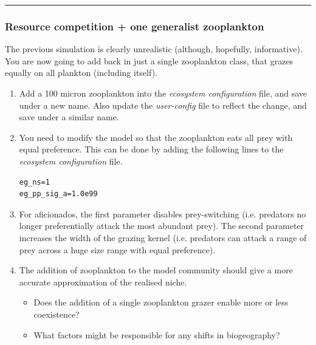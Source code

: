 \vspace{1mm}
\noindent\rule{4cm}{0.1mm}

\subsubsection*{Resource competition + one generalist zooplankton}
\vspace{1mm}

The previous simulation is clearly unrealistic (although, hopefully, informative). You are now going to add back in just a single zooplankton class, that grazes equally on all plankton (including itself).

\begin{enumerate}[noitemsep]
\vspace{1mm}
\item Add a 100 micron zooplankton into the \textit{ecosystem configuration} file, and save under a new name. Also update the \textit{user-config} file to reflect the change, and save under a similar name.
\vspace{1mm}
\item You need to modify the model so that the zooplankton eats all prey with equal preference. This can be done by adding the following lines to the \textit{ecosystem configuration} file.
\vspace{-1mm}\small\begin{verbatim}
eg_ns=1
eg_pp_sig_a=1.0e99
\end{verbatim}\normalsize\vspace{-1mm}
\item[NOTE:] For aficionados, the first parameter disables prey-switching (i.e. predators no longer preferentially attack the most abundant prey). The second parameter increases the width of the grazing kernel (i.e. predators can attack a range of prey across a huge size range with equal preference).
\vspace{1mm}
\item The addition of zooplankton to the model community should give a more accurate approximation of the realised niche.
\vspace{1mm}
\begin{itemize}
\item Does the addition of a single zooplankton grazer enable more or less coexistence?
\item What factors might be responsible for any shifts in biogeography?
\end{itemize}
\end{enumerate}


